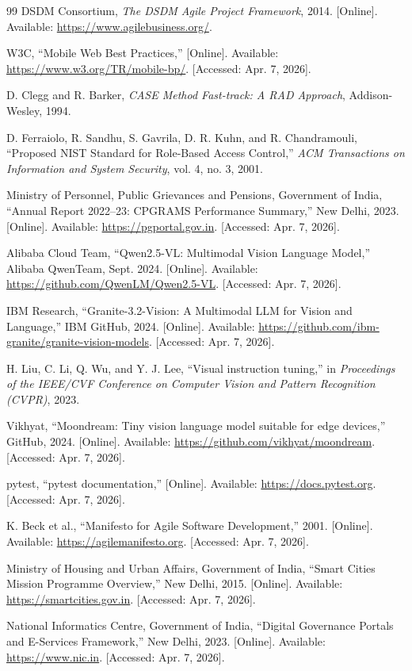 \begin{thebibliography}{99}
DSDM Consortium,
\newblock \textit{The DSDM Agile Project Framework}, 2014. [Online]. Available: \url{https://www.agilebusiness.org/}.

W3C,
\newblock ``Mobile Web Best Practices,'' [Online]. Available: \url{https://www.w3.org/TR/mobile-bp/}. [Accessed: Apr. 7, 2026].

D. Clegg and R. Barker,
\newblock \textit{CASE Method Fast-track: A RAD Approach}, Addison-Wesley, 1994.

D. Ferraiolo, R. Sandhu, S. Gavrila, D. R. Kuhn, and R. Chandramouli,
\newblock ``Proposed NIST Standard for Role-Based Access Control,'' \textit{ACM Transactions on Information and System Security}, vol. 4, no. 3, 2001.

Ministry of Personnel, Public Grievances and Pensions, Government of India,
\newblock ``Annual Report 2022--23: CPGRAMS Performance Summary,'' New Delhi, 2023. [Online]. Available: \url{https://pgportal.gov.in}. [Accessed: Apr. 7, 2026].

Alibaba Cloud Team,
\newblock ``Qwen2.5-VL: Multimodal Vision Language Model,'' Alibaba QwenTeam, Sept. 2024. [Online]. Available: \url{https://github.com/QwenLM/Qwen2.5-VL}. [Accessed: Apr. 7, 2026].

IBM Research,
\newblock ``Granite-3.2-Vision: A Multimodal LLM for Vision and Language,'' IBM GitHub, 2024. [Online]. Available: \url{https://github.com/ibm-granite/granite-vision-models}. [Accessed: Apr. 7, 2026].

H. Liu, C. Li, Q. Wu, and Y. J. Lee,
\newblock ``Visual instruction tuning,'' in \textit{Proceedings of the IEEE/CVF Conference on Computer Vision and Pattern Recognition (CVPR)}, 2023.

Vikhyat,
\newblock ``Moondream: Tiny vision language model suitable for edge devices,'' GitHub, 2024. [Online]. Available: \url{https://github.com/vikhyat/moondream}. [Accessed: Apr. 7, 2026].

pytest,
\newblock ``pytest documentation,'' [Online]. Available: \url{https://docs.pytest.org}. [Accessed: Apr. 7, 2026].

K. Beck et al.,
\newblock ``Manifesto for Agile Software Development,'' 2001. [Online]. Available: \url{https://agilemanifesto.org}. [Accessed: Apr. 7, 2026].

Ministry of Housing and Urban Affairs, Government of India,
\newblock ``Smart Cities Mission Programme Overview,'' New Delhi, 2015. [Online]. Available: \url{https://smartcities.gov.in}. [Accessed: Apr. 7, 2026].

National Informatics Centre, Government of India,
\newblock ``Digital Governance Portals and E-Services Framework,'' New Delhi, 2023. [Online]. Available: \url{https://www.nic.in}. [Accessed: Apr. 7, 2026].

\end{thebibliography}